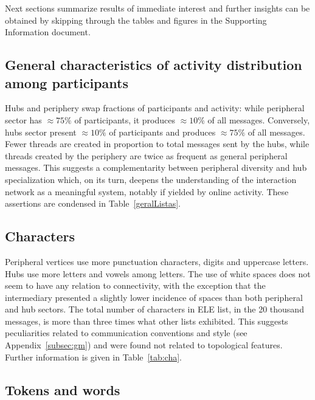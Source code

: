 \documentclass[%
 aip,
 jmp,%
 amsmath,amssymb,
 reprint,%
]{revtex4-1}
\begin{document}
Next sections summarize results of immediate interest
and further insights can be obtained by skipping through
the tables and figures in the Supporting Information document.

\subsection{General characteristics of activity distribution among participants}\label{sec:gen}
Hubs and periphery swap fractions of participants and activity:
while peripheral sector has $\approx 75\%$ of participants, it produces $\approx 10\%$ of all messages.
Conversely, hubs sector present $\approx 10\%$ of participants and produces $\approx 75\%$ of all messages.
Fewer threads are created in proportion to total messages sent by the hubs,
while threads created by the periphery are twice as frequent as general peripheral messages.
This suggests a complementarity between peripheral diversity and hub specialization
which, on its turn, deepens the understanding of the interaction network as a meaningful system, 
notably if yielded by online activity.
These assertions are condensed in Table~\ref{geralListas}.


\subsection{Characters}\label{sec:cha}
Peripheral vertices use more punctuation characters, digits and uppercase letters.
Hubs use more letters and vowels among letters.
The use of white spaces does not seem to have any relation to connectivity, with the exception that the intermediary presented a slightly lower incidence of spaces than both peripheral and hub sectors. 
The total number of characters in ELE list,
in the 20 thousand messages,
is more than three times what other lists exhibited.
This suggests peculiarities related to communication conventions and style (see Appendix~\ref{subsec:gm}) and were found not related to topological features.
Further information is given in Table~\ref{tab:cha}.

\subsection{Tokens and words}\label{subsec:tw}
\end{document}
